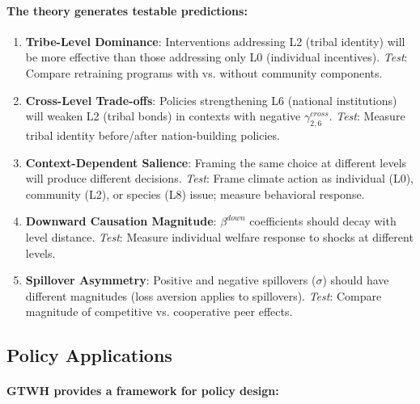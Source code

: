 \paragraph{The theory generates testable predictions:}

\begin{enumerate}
\item \textbf{Tribe-Level Dominance}: Interventions addressing L2 (tribal identity) 
will be more effective than those addressing only L0 (individual incentives).
\textit{Test}: Compare retraining programs with vs. without community components.

\item \textbf{Cross-Level Trade-offs}: Policies strengthening L6 (national institutions) 
will weaken L2 (tribal bonds) in contexts with negative $\gamma^{cross}_{2,6}$.
\textit{Test}: Measure tribal identity before/after nation-building policies.

\item \textbf{Context-Dependent Salience}: Framing the same choice at different 
levels will produce different decisions.
\textit{Test}: Frame climate action as individual (L0), community (L2), or 
species (L8) issue; measure behavioral response.

\item \textbf{Downward Causation Magnitude}: $\beta^{down}$ coefficients 
should decay with level distance.
\textit{Test}: Measure individual welfare response to shocks at different levels.

\item \textbf{Spillover Asymmetry}: Positive and negative spillovers ($\sigma$) 
should have different magnitudes (loss aversion applies to spillovers).
\textit{Test}: Compare magnitude of competitive vs. cooperative peer effects.
\end{enumerate}

\subsection{Policy Applications}

\paragraph{GTWH provides a framework for policy design:}

